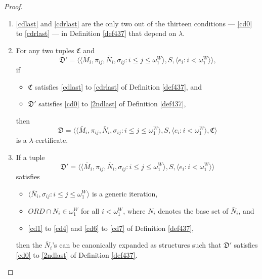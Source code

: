 \documentclass[12pt]{article}
\numberwithin{equation}{section}
\begin{document}
\begin{proof}
\begin{rem}\label{rem438}
\leavevmode
\begin{enumerate}[label=(\arabic*)]
    \item\label{dependl} \ref{cdlast} and \ref{cdrlast} are the only two out of the thirteen conditions --- \ref{cd0} to \ref{cdrlast} --- in Definition \ref{def437} that depend on $\lambda$.
    \item\label{4390} For any two tuples $\mathfrak{C}$ and
    \begin{equation*}
        \mathfrak{D}' = \langle \langle \bar{M}_i, \pi_{ij},  \bar{N}_i, \sigma_{ij} : i \leq j \leq \omega_1^{W} \rangle, S, \langle e_i : i < \omega_1^W \rangle \rangle \text{,}
    \end{equation*}
    if
    \begin{itemize}
        \item $\mathfrak{C}$ satisfies \ref{cdlast} to \ref{cdrlast} of Definition \ref{def437}, and
        \item $\mathfrak{D}'$ satisfies \ref{cd0} to \ref{2ndlast} of Definition \ref{def437},
    \end{itemize}
    then
    \begin{equation*}
        \mathfrak{D} = \langle \langle \bar{M}_i, \pi_{ij},  \bar{N}_i, \sigma_{ij} : i \leq j \leq \omega_1^{W} \rangle, S, \langle e_i : i < \omega_1^W \rangle, \mathfrak{C} \rangle
    \end{equation*}
    is a $\lambda$-certificate.
    \item\label{4391} If a tuple
    \begin{equation*}
        \mathfrak{D}' = \langle \langle \bar{M}_i, \pi_{ij},  \bar{N}_i, \sigma_{ij} : i \leq j \leq \omega_1^{W} \rangle, S, \langle e_i : i < \omega_1^W \rangle \rangle
    \end{equation*}
    satisfies 
    \begin{itemize}
        \item $\langle \bar{N}_i, \sigma_{ij} : i \leq  j \leq \omega_1^{W} \rangle$ is a generic iteration, 
        \item $ORD \cap N_i \in \omega_1^W$ for all $i < \omega_1^W$, where $N_i$ denotes the base set of $\bar{N}_i$, and
        \item \ref{cd1} to \ref{cd4} and \ref{cd6} to \ref{cd7} of Definition \ref{def437},
    \end{itemize}
    then the $\bar{N}_i$'s can be canonically expanded as structures such that $\mathfrak{D}'$ satisfies \ref{cd0} to \ref{2ndlast} of Definition \ref{def437}.

\end{enumerate}
\end{rem}
\end{proof}
\end{document}
